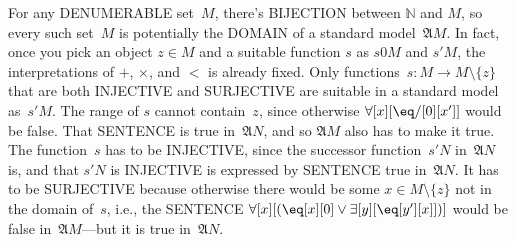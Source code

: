 \documentclass[10pt,a4paper]{article}
\newcommand*{\olup}[1]{\MakeUppercase{#1}}
\theoremstyle{plain}
\theoremstyle{definition}
\theoremstyle{remark}
\newenvironment{explain}{}{}
\providecommand{\lforall}{\mathord{\forall}}
\providecommand{\lexists}{\mathord{\exists}}
\providecommand{\Obj}{}
\providecommand{\Struct}{\ensuremath{\mathfrak{A}}}
\providecommand{\Assign}{\ensuremath{s}}
\providecommand{\Nat}{\ensuremath{\mathbb{N}}}
\begin{document}
\begin{explain}
For any \olup{denumerable} set~$M$, there's \olup{bijection} between
$\Nat$ and $M$, so every such set~$M$ is potentially the \olup{domain} of
a standard model~$\Struct{M}$. In fact, once you pick an object $z \in
M$ and a suitable function $s$ as $\Assign{\Obj{0}}{M}$ and
$\Assign{\prime}{M}$, the interpretations of $+$, $\times$, and $<$ is
already fixed.  Only functions~$s\colon M \to M \setminus \{z\}$ that
are both \olup{injective} and \olup{surjective} are suitable in a standard
model as~$\Assign{\prime}{M}$.  The range of $s$ cannot contain~$z$,
since otherwise $\lforall[x][\eq/[\Obj 0][x']]$ would be false. That
\olup{sentence} is true in~$\Struct{N}$, and so $\Struct{M}$ also has to
make it true. The function~$s$ has to be \olup{injective}, since the
successor function~$\Assign{\prime}{N}$ in~$\Struct{N}$ is, and that
$\Assign{\prime}{N}$ is \olup{injective} is expressed by \olup{sentence}
true in~$\Struct{N}$. It has to be \olup{surjective} because otherwise
there would be some $x \in M \setminus \{z\}$ not in the domain
of~$s$, i.e., the \olup{sentence} $\lforall[x][(\eq[x][\Obj 0] \lor
\lexists[y][\eq[y'][x]])]$ would be false in~$\Struct{M}$---but it is
true in~$\Struct{N}$.
\end{explain}
\end{document}
